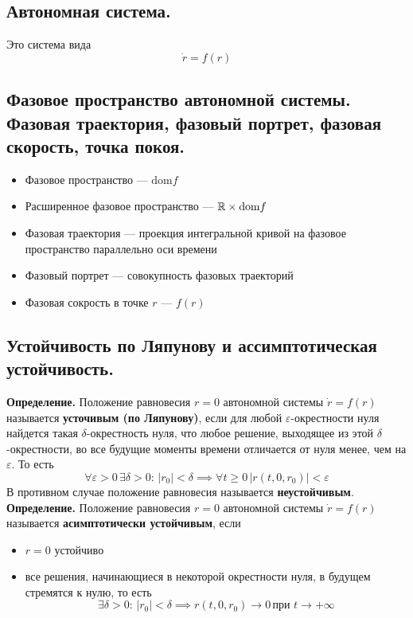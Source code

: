 \subsection*{Автономная система.}

Это система вида
\[\dot{r} = f(r)\]

\subsection*{Фазовое пространство автономной системы. Фазовая траектория, фазовый портрет, фазовая скорость, точка покоя.}

\begin{itemize}
    \item Фазовое пространство --- \(\text{dom} f\)
    \item Расширенное фазовое пространство --- \(\mathbb{R} \times \text{dom} f\)
    \item Фазовая траектория --- проекция интегральной кривой на фазовое пространство параллельно оси времени
    \item Фазовый портрет --- совокупность фазовых траекторий
    \item Фазовая сокрость в точке \(r\) --- \(f(r)\)
\end{itemize}

\subsection*{Устойчивость по Ляпунову и ассимптотическая устойчивость.}

\noindent \textbf{Определение.} Положение равновесия $r = 0$ автономной системы $\dot{r} = f(r)$ называется \textbf{усточивым (по Ляпунову)}, если для любой $\varepsilon$-окрестности нуля найдется такая $\delta$-окрестность нуля, что любое решение, выходящее из этой $\delta$-окрестности, во все будущие моменты времени отличается от нуля менее, чем на $\varepsilon$. То есть
\begin{equation*}
    \forall \varepsilon > 0 \, \exists \delta > 0:\, |r_0| < \delta \implies \forall t \ge 0 \, |r(t,0,r_0)| < \varepsilon
\end{equation*}
В противном случае положение равновесия называется \textbf{неустойчивым}.\\

\noindent \textbf{Определение.} Положение равновесия $r = 0$ автономной системы $\dot{r} = f(r)$ называется \textbf{асимптотически устойчивым}, если
\begin{itemize}
    \item $r = 0$ устойчиво
    \item все решения, начинающиеся в некоторой окрестности нуля, в будущем стремятся к нулю, то есть
          \begin{equation*}
              \exists \delta > 0:\, |r_0| < \delta \implies r(t,0,r_0) \to 0\, \text{при } t \to +\infty
          \end{equation*}
\end{itemize}

